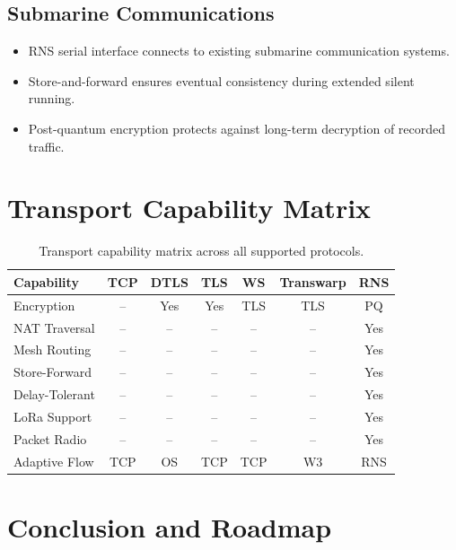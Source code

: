 \documentclass[11pt,letterpaper]{article}
\begin{document}
\subsection{Submarine Communications}

\begin{itemize}
\item RNS serial interface connects to existing submarine communication systems.
\item Store-and-forward ensures eventual consistency during extended silent running.
\item Post-quantum encryption protects against long-term decryption of recorded traffic.
\end{itemize}

\section{Transport Capability Matrix}

\begin{table}[H]
\centering
\small
\begin{tabular}{@{}lcccccc@{}}
\toprule
\textbf{Capability} & \textbf{TCP} & \textbf{DTLS} & \textbf{TLS} & \textbf{WS} & \textbf{Transwarp} & \textbf{RNS} \\
\midrule
Encryption & -- & Yes & Yes & TLS & TLS & PQ \\
NAT Traversal & -- & -- & -- & -- & -- & Yes \\
Mesh Routing & -- & -- & -- & -- & -- & Yes \\
Store-Forward & -- & -- & -- & -- & -- & Yes \\
Delay-Tolerant & -- & -- & -- & -- & -- & Yes \\
LoRa Support & -- & -- & -- & -- & -- & Yes \\
Packet Radio & -- & -- & -- & -- & -- & Yes \\
Adaptive Flow & TCP & OS & TCP & TCP & W3 & RNS \\
\bottomrule
\end{tabular}
\caption{Transport capability matrix across all supported protocols.}
\label{tab:transport-matrix}
\end{table}

\section{Conclusion and Roadmap}
\end{document}
